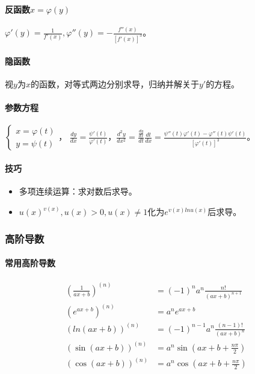 \documentclass[
12pt, %
a4paper, 
oneside, %
headinclude,footinclude, %
]{scrartcl}
\begin{document}
\paragraph{反函数$ x = \varphi (y) $}
$ \varphi '(y) = \frac{1}{f'(x)}, \varphi''(y) = -\frac{f''(x)}{[f'(x)]^3} $。
\paragraph{隐函数}
视$ y $为$ x $的函数，对等式两边分别求导，归纳并解关于$ y' $的方程。
\paragraph{参数方程}
$
\begin{cases}
x = \varphi (t) \\
y = \psi (t)
\end{cases}
$，
$ \frac{dy}{dx} = \frac{\psi' (t)}{\varphi' (t)} $，$ \frac{d^2y}{dx^2} = \frac{\frac{dy}{dx}}{dt} \frac{dt}{dx} = \frac{\psi'' (t) \varphi' (t) - \varphi'' (t) \psi' (t)}{[\varphi' (t)]^3} $。
\paragraph{技巧}
\begin{itemize}
\item 多项连续运算：求对数后求导。
\item $ u(x)^{v(x)}, u(x) > 0, u(x) \neq 1 $化为$ e^{v(x)ln u(x)} $后求导。
\end{itemize}
\subsubsection[高阶导数]{高阶导数}
\paragraph{常用高阶导数}
\begin{align*}
(\frac{1}{ax + b})^{(n)} &= (-1)^n a^n \frac{n!}{(ax + b)^{n + 1}} \\
(e^{ax + b})^{(n)} &= a^n e^{ax + b} \\
(ln(ax + b))^{(n)} &= (-1)^{n - 1} a^n \frac{(n - 1)!}{(ax + b)^n} \\
(\sin(ax + b))^{(n)} &= a^n \sin(ax + b + \frac{n\pi}{2}) \\
(\cos(ax + b))^{(n)} &= a^n \cos(ax + b + \frac{n\pi}{2})
\end{align*}
\end{document}
